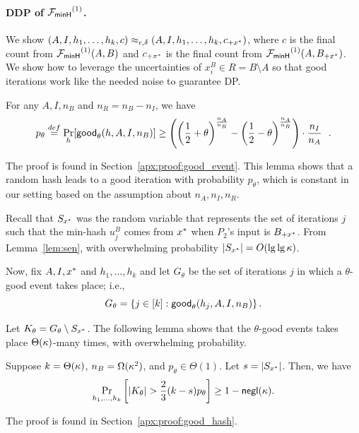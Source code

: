 \paragraph{DDP of ${\mathcal{F}_\mathsf{minH}}^{(1)}$.}
We show $(A, I, h_1, \ldots, h_k, c) \approx_{\epsilon,\delta} (A,
I, h_1, \ldots, h_k, c_{+{x^*}})$, where $c$ is the final count from
${\mathcal{F}_\mathsf{minH}}^{(1)}(A, B)$ and $c_{+{x^*}}$ is the final count from ${\mathcal{F}_\mathsf{minH}}^{(1)}(A, B_{+x^*})$. 
%
We show how to leverage the uncertainties of $x^B_i
\in R = B \setminus A$ so that good iterations work like the needed noise to
guarantee DP.


\begin{lemma}\label{lem:good_event}
For any $A, I, n_B$ and $n_R = n_B - n_I$, we have
 \[p_\theta \stackrel{def}{=} \Pr_{h}[\mathsf{good}_\theta(h, A,
 I, n_B)] \ge
 \left(\left(\frac{1}{2}+\theta \right)^{\frac{n_A}{n_R}} -
 \left(\frac{1}{2}-\theta \right)^{\frac{n_A}{n_R}}\right) \cdot
 \frac{n_I}{n_A} ~~.\]
\end{lemma}
The proof is found in Section~\ref{apx:proof:good_event}.
This lemma shows that a random hash leads to a good iteration with
probability $p_\theta$, which is constant in our setting based on the assumption
about $n_A, n_I, n_R$.

Recall that $S_{{x^*}}$ was the random variable that represents the set of  
iterations $j$ such that the min-hash $u_j^B$ comes from ${x^*}$ when
$P_2$'s input is $B_{+x^*}$. From Lemma~\ref{lem:sen}, with overwhelming
probability $|S_{{x^*}}| = O(\lg\lg\kappa)$.  

Now, fix $A, I, {x^*}$ and $h_1, \ldots, h_k$ and let $G_{\theta}$ be the set of
iterations $j$ in which a $\theta$-good event takes place; i.e.,
%
$$G_{\theta} = \left\{ j \in [k]: \mathsf{good}_\theta(h_j, A, I, n_B) \right\}.$$

Let $K_{\theta} = G_{\theta} \setminus S_{{x^*}}$. 
The following lemma shows that the $\theta$-good events takes place
$\Theta(\kappa)$-many times, with overwhelming probability.  

\begin{lemma}\label{thm:good_hash}
Suppose $k = \Theta(\kappa)$, $n_B = \Omega(\kappa^2)$, and
$p_\theta \in \Theta(1)$. Let $s = |S_{x^*}|$. Then, 
we have 
\[ \Pr_{h_1, \ldots, h_k}\left[ |K_\theta| > \frac{2}{3} (k-s) p_\theta \right ] \ge 1 - \mathsf{negl}(\kappa).\] 
\end{lemma}
The proof is found in Section~\ref{apx:proof:good_hash}.



